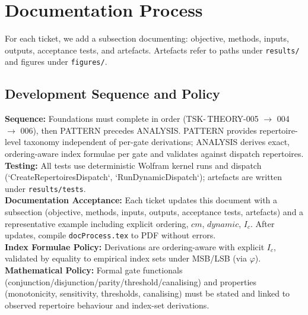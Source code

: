 \documentclass[11pt]{article}
\begin{document}
\section{Documentation Process}
For each ticket, we add a subsection documenting: objective, methods, inputs, outputs, acceptance tests, and artefacts. Artefacts refer to paths under \texttt{results/} and figures under \texttt{figures/}.
\subsection*{Development Sequence and Policy}
\textbf{Sequence:} Foundations must complete in order (TSK-\,THEORY-005 \(\rightarrow\) 004 \(\rightarrow\) 006), then PATTERN precedes ANALYSIS. PATTERN provides repertoire-level taxonomy independent of per-gate derivations; ANALYSIS derives exact, ordering-aware index formulae per gate and validates against dispatch repertoires.\\
\textbf{Testing:} All tests use deterministic Wolfram kernel runs and dispatch (`CreateRepertoiresDispatch`, `RunDynamicDispatch`); artefacts are written under \texttt{results/tests}.\\
\textbf{Documentation Acceptance:} Each ticket updates this document with a subsection (objective, methods, inputs, outputs, acceptance tests, artefacts) and a representative example including explicit ordering, \(cm\), \(dynamic\), \(I_c\). After updates, compile \texttt{docProcess.tex} to PDF without errors.\\
\textbf{Index Formulae Policy:} Derivations are ordering-aware with explicit \(I_c\), validated by equality to empirical index sets under MSB/LSB (via \(\varphi\)).\\
\textbf{Mathematical Policy:} Formal gate functionals (conjunction/disjunction/parity/threshold/canalising) and properties (monotonicity, sensitivity, thresholds, canalising) must be stated and linked to observed repertoire behaviour and index-set derivations.
\end{document}
